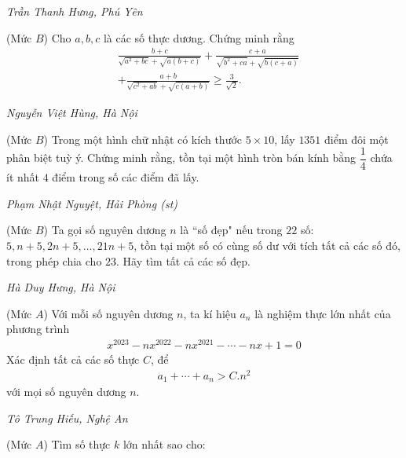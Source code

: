 \begin{multicols}{2}
\begin{figure}[H]
		\vspace*{-10pt}
	\end{figure}
	\begin{flushright}
		\textit{Trần Thanh Hưng, Phú Yên}
	\end{flushright}
	{}
	(Mức $B$) Cho $a, b, c$ là các số thực dương. Chứng minh rằng
	\begin{align*}
		&\frac{b+c}{\sqrt{\!a^2\!+\!b c}\!+\!\!\sqrt{\!a(b+c)}}\!+\!\frac{c\!+\!a}{\sqrt{\!b^2\!+\!c a}\!+\!\!\sqrt{\!b(c\!+\!a)}}\\
		&+\frac{a+b}{\sqrt{c^2+a b}+\sqrt{c(a+b)}} \geq \frac{3}{\sqrt{2}} .
	\end{align*}
	\begin{flushright}
		\textit{Nguyễn Việt Hùng, Hà Nội}
	\end{flushright}
	{}
	(Mức $B$) Trong một hình chữ nhật có kích thước $5\times 10$, lấy $1351$ điểm đôi một phân biệt tuỳ ý. Chứng minh rằng, tồn tại một hình tròn bán kính bằng $\dfrac14$ chứa ít nhất $4$ điểm trong số các điểm đã lấy.
	\begin{flushright}
		\textit{Phạm Nhật Nguyệt, Hải Phòng (st)}
	\end{flushright}
	{}
	(Mức $B$) Ta gọi số nguyên dương $n$ là ``số đẹp" nếu trong $22$ số: $5,n+5,2n+5,\ldots,21n+5$, tồn tại một số có cùng số dư với tích tất cả các số đó, trong phép chia cho $23$. Hãy tìm tất cả các số đẹp.
	\begin{flushright}
		\textit{Hà Duy Hưng, Hà Nội}
	\end{flushright}
	{}
	(Mức $A$) Với mỗi số nguyên dương $n$, ta kí hiệu $a_n$ là nghiệm thực lớn nhất của phương trình
	\begin{align*}
		x^{2023}-nx^{2022}-nx^{2021}-\cdots-nx+1=0
	\end{align*}
	Xác định tất cả các số thực $C$, để 
	\begin{align*}
		a_1+\cdots+a_n>C. n^2
	\end{align*}
	với mọi số nguyên dương $n$.
	\begin{flushright}
		\textit{Tô Trung Hiếu, Nghệ An}
	\end{flushright}
	{}
	(Mức $A$) Tìm số thực $k$ lớn nhất sao cho: 

\end{multicols}
